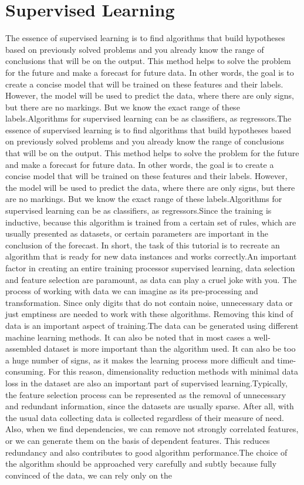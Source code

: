 \section{Supervised Learning}\label{sec:3.5}
\vspace{-0.5cm}
\noindent The essence of supervised learning is to find algorithms that build hypotheses based on previously solved problems and you already know the range of conclusions that will be on the output. This method helps to solve the problem for the future and make a forecast for future data. In other words, the goal is to create a concise model that will be trained on these features and their labels. However, the model will be used to predict the data, where there are only signs, but there are no markings. But we know the exact range of these labels.Algorithms for supervised learning can be as classifiers, as regressors.The essence of supervised learning is to find algorithms that build hypotheses based on previously solved problems and you already know the range of conclusions that will be on the output. This method helps to solve the problem for the future and make a forecast for future data. In other words, the goal is to create a concise model that will be trained on these features and their labels. However, the model will be used to predict the data, where there are only signs, but there are no markings. But we know the exact range of these labels.Algorithms for supervised learning can be as classifiers, as regressors.Since the training is inductive, because this algorithm is trained from a certain set of rules, which are usually presented as datasets, or certain parameters are important in the conclusion of the forecast. In short, the task of this tutorial is to recreate an algorithm that is ready for new data instances and works correctly.An important factor in creating an entire training processor supervised learning, data selection and feature selection are paramount, as data can play a cruel joke with you. The process of working with data we can imagine as its pre-processing and transformation. Since only digits that do not contain noise, unnecessary data or just emptiness are needed to work with these algorithms. Removing this kind of data is an important aspect of training.The data can be generated using different machine learning methods. It can also be noted that in most cases a well-assembled dataset is more important than the algorithm used. It can also be too a huge number of signs, as it makes the learning process more difficult and time-consuming. For this reason, dimensionality reduction methods with minimal data loss in the dataset are also an important part of supervised learning.Typically, the feature selection process can be represented as the removal of unnecessary and redundant information, since the datasets are usually sparse. After all, with the usual data collecting data is collected regardless of their measure of need. Also, when we find dependencies, we can remove not strongly correlated features, or we can generate them on the basis of dependent features. This reduces redundancy and also contributes to good algorithm performance.The choice of the algorithm should be approached very carefully and subtly because fully convinced of the data, we can rely only on the 